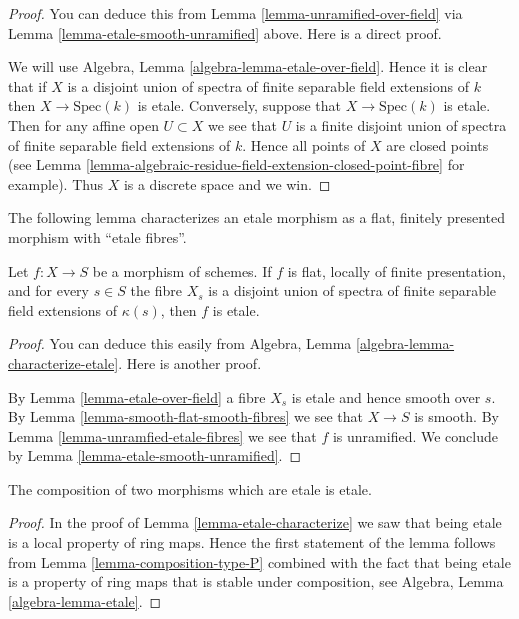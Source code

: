 \begin{proof}
You can deduce this from Lemma \ref{lemma-unramified-over-field}
via Lemma \ref{lemma-etale-smooth-unramified} above.
Here is a direct proof.

\medskip\noindent
We will use Algebra, Lemma \ref{algebra-lemma-etale-over-field}.
Hence it is clear that if $X$ is a disjoint union of spectra of finite
separable field extensions of $k$ then $X \to \text{Spec}(k)$ is etale.
Conversely, suppose that $X \to \text{Spec}(k)$ is etale. Then for any affine
open $U \subset X$ we see that $U$ is a finite disjoint union of spectra
of finite separable field extensions of $k$. Hence all points of $X$
are closed points (see
Lemma \ref{lemma-algebraic-residue-field-extension-closed-point-fibre}
for example). Thus $X$ is a discrete space and we win.
\end{proof}

\noindent
The following lemma characterizes an etale morphism as a
flat, finitely presented morphism with ``etale fibres''.

\begin{lemma}
\label{lemma-etale-flat-etale-fibres}
Let $f : X \to S$ be a morphism of schemes.
If $f$ is flat, locally of finite presentation, and for every $s \in S$
the fibre $X_s$ is a disjoint union of spectra of finite separable
field extensions of $\kappa(s)$, then $f$ is etale.
\end{lemma}

\begin{proof}
You can deduce this easily from
Algebra, Lemma \ref{algebra-lemma-characterize-etale}.
Here is another proof.

\medskip\noindent
By Lemma \ref{lemma-etale-over-field} a fibre $X_s$ is etale
and hence smooth over $s$. By Lemma \ref{lemma-smooth-flat-smooth-fibres}
we see that $X \to S$ is smooth.
By Lemma \ref{lemma-unramfied-etale-fibres}
we see that $f$ is unramified. We conclude by
Lemma \ref{lemma-etale-smooth-unramified}.
\end{proof}

\begin{lemma}
\label{lemma-composition-etale}
The composition of two morphisms which are etale is etale.
\end{lemma}

\begin{proof}
In the proof of Lemma \ref{lemma-etale-characterize}
we saw that being etale is a local property of ring maps.
Hence the first statement of the lemma follows from
Lemma \ref{lemma-composition-type-P} combined
with the fact that being etale is a property of ring maps that is
stable under composition, see
Algebra, Lemma \ref{algebra-lemma-etale}.
\end{proof}

